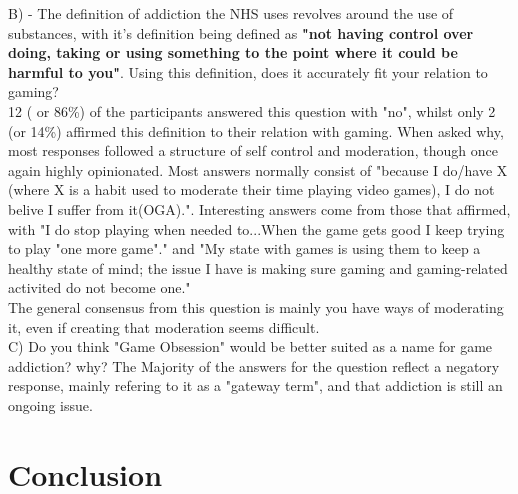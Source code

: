 \documentclass[conference]{IEEEtran}
\begin{document}
B) - The definition of addiction the NHS uses revolves around the use of substances, with it's definition being defined as \textbf{"not having control over doing, taking or using something to the point where it could be harmful to you"}. Using this definition, does it accurately fit your relation to gaming?\\

12 ( or 86\%) of the participants answered this question with "no", whilst only 2 (or 14\%) affirmed this definition to their relation with gaming. When asked why, most responses followed a structure of self control and moderation, though once again highly opinionated. Most answers normally consist of "because I do/have X (where X is a habit used to moderate their time playing video games), I do not belive I suffer from it(OGA).". Interesting answers come from those that affirmed, with "I do stop playing when needed to...When  the game gets good I keep trying to play "one more game"." and "My state with games is using them to keep a healthy state of mind; the issue I have is making sure gaming and gaming-related activited do not become one."\\

The general consensus from this question is mainly you have ways of moderating it, even if creating that moderation seems difficult.\\

C) Do you think "Game Obsession" would be better suited as a name for game addiction? why?
The Majority of the answers for the question reflect a negatory response, mainly refering to it as a "gateway term", and that addiction is still an ongoing issue. 


\section{Conclusion}




\end{document}
